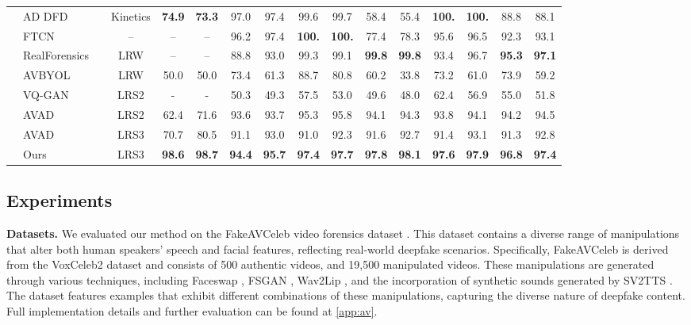\documentclass{article} \usepackage{iclr2024_conference,times}
\begin{document}
\begin{table}[t]
{\begin{tabular}{clcccccccccccccc}
& AD DFD              &                                                &     Kinetics                                                                         &       \textbf{74.9}       &       \textbf{73.3} &      97.0         &     97.4          &      99.6       &     99.7         &         58.4   &   55.4       &        \textbf{100.}    &      \textbf{100.}    & 88.8 & 88.1     \\
& FTCN                                  &                              &          --                                                                     &    --        &   --        &   96.2    &      97.4       &    \textbf{100.}          &      \textbf{100.}        &      77.4       &       78.3    &    95.6       &    96.5    & 92.3 &   93.1    \\
& RealForensics   &    & LRW   &   --   &  --   &    88.8      &     93.0&      99.3       &   99.1    &           \textbf{99.8}     &       \textbf{99.8}      &   93.4  &     96.7  & \textbf{95.3} & \textbf{97.1}       \\
\cmidrule(lr){1-16}
\parbox[t]{4mm}{} & AVBYOL &  & LRW & 50.0 & 50.0 & 73.4 & 61.3 & 88.7 & 80.8 & 60.2 & 33.8 & 73.2 & 61.0 & 73.9 & 59.2 \\
& VQ-GAN &  & LRS2 & - & - & 50.3 & 49.3 & 57.5 & 53.0 & 49.6 & 48.0 & 62.4 & 56.9 & 55.0 & 51.8 \\
& AVAD &  & LRS2 & 62.4 & 71.6  & 93.6 & 93.7 & 95.3 & 95.8 & 94.1 & 94.3 & 93.8 & 94.1 & 94.2 & 94.5  \\
& AVAD &  & LRS3 & 70.7 & 80.5  & 91.1 & 93.0 & 91.0 & 92.3 & 91.6 & 92.7 & 91.4 & 93.1 & 91.3 & 92.8 \\
& Ours &  & LRS3 & \textbf{98.6} & \textbf{98.7} & \textbf{94.4} & \textbf{95.7} & \textbf{97.4} & \textbf{97.7} & \textbf{97.8} & \textbf{98.1} & \textbf{97.6} & \textbf{97.9} & \textbf{96.8} & \textbf{97.4}\\
\bottomrule
\end{tabular}
}
\vspace{-0.25em}
\end{table}

\subsection{Experiments}
\textbf{Datasets.} 
We evaluated our method on the FakeAVCeleb video forensics dataset \citep{fakeavceleb}. This dataset contains a diverse range of manipulations that alter both human speakers' speech and facial features, reflecting real-world deepfake scenarios. Specifically, FakeAVCeleb is derived from the VoxCeleb2 dataset and consists of 500 authentic videos, and 19,500 manipulated videos. These manipulations are generated through various techniques, including Faceswap \citep{faceswap}, FSGAN \citep{faceswap4}, Wav2Lip \citep{wav2lip}, and the incorporation of synthetic sounds generated by SV2TTS \citep{sv2tts}. The dataset features examples that exhibit different combinations of these manipulations, capturing the diverse nature of deepfake content. Full implementation details and further evaluation can be found at \cref{app:av}.
\end{document}
